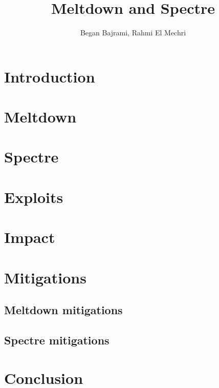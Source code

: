 \documentclass[12pt, a4paper, twocolumn]{article}
\title{Meltdown and Spectre}
\author{Began Bajrami, Rahmi El Mechri}
\begin{document}
\maketitle
\begin{abstract}
\end{abstract}
\section{Introduction}

\section{Meltdown}


\section{Spectre}


\section{Exploits}


\section{Impact}


\section{Mitigations}

\subsection{Meltdown mitigations}
\subsection{Spectre mitigations}
\section{Conclusion}

\end{document}
